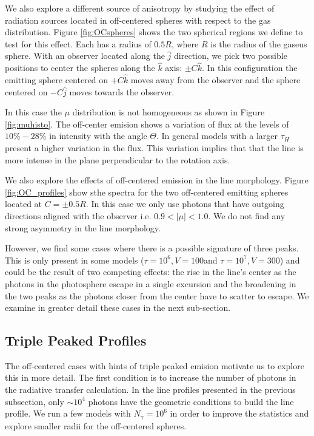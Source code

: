 \documentclass{emulateapj}
\newcommand{\kms}{{\ifmmode{{\mathrm{\,km\ s}^{-1}}}\else{\,km~s$^{-1}$}\fi}}
\begin{document}
We also explore a different source of anisotropy by studying the effect
of radiation sources located in off-centered spheres with respect to
the gas distribution. Figure \ref{fig:OCspheres} shows the two
spherical regions we define to test for this effect. Each has a radius
of $0.5R$, where $R$ is the radius of the gaseus sphere. With an
observer located along the $\hat{j}$ direction, we pick two possible
positions to center the spheres along the $\hat{k}$ axis: $\pm C\hat{k}$. In
this configuration the emitting sphere centered on $+C\hat{k}$ moves
away from the observer and the sphere centered on $-C\hat{j}$ moves
towards the observer. 


In this case the $\mu$ distribution is not homogeneous as shown in
Figure \ref{fig:muhisto}. The off-center emision shows a variation of flux at
the levels of $10\% - 28\%$ in intensity with the angle $\Theta$. In general 
models with a larger $\tau_{H}$ present a higher variation in the flux.
This variation implies that that the line is more intense in
the plane perpendicular to the rotation axis. 


We also explore the effects of off-centered emission in the line
morphology. Figure \ref{fig:OC_profiles} show sthe spectra for the two
off-centered emitting spheres located at $C=\pm0.5R$.  In this case we
only use photons that have outgoing directions aligned with the
observer i.e. $0.9 <\vert \mu \vert < 1.0$. We do not find any strong
asymmetry in the line morphology.  


However, we find some cases where there is a possible signature of
three peaks. This is only present in some models ($\tau = 10^6,
V=100$\kms and $\tau = 10^7, V=300$\kms) and could be the result of
two competing effects: the rise in the line's center as the photons in
the photosphere escape in a single excursion and the broadening in the
two peaks as the photons closer from the center have to scatter to
escape. We examine in greater detail these cases in the next
sub-section. 



\subsection{Triple Peaked Profiles}
\label{sec:3p}

The off-centered cases with hints of triple peaked emision motivate us
to explore this in more detail. The first condition is to increase the
number of photons in the radiative transfer calculation. In the line
profiles presented in the previous subsection, only $\sim 10^4$ photons
have the geometric conditions to build the line profile. We run a few
models with $N_{\gamma} = 10^6$ in order to improve the statistics and
explore smaller radii for the off-centered spheres.
\end{document}

